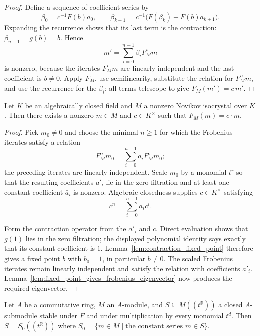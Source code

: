 \begin{proof}
  \leanok
  Define a sequence of coefficient series by
  \[
    \beta_0=c^{-1}F(b)a_0,
    \qquad
    \beta_{k+1}=c^{-1}\bigl(F(\beta_k)+F(b)a_{k+1}\bigr).
  \]
  Expanding the recurrence shows that its last term is the contraction:
  $\beta_{n-1}=g(b)=b$.  Hence
  \[
    m'=\sum_{i=0}^{n-1}\beta_iF_M^im
  \]
  is nonzero, because the iterates $F_M^im$ are linearly independent and the
  last coefficient is $b\ne0$.  Apply $F_M$, use semilinearity, substitute the
  relation for $F_M^nm$, and use the recurrence for the $\beta_i$; all terms
  telescope to give $F_M(m')=c\,m'$.
\end{proof}

\begin{theorem}
  \label{thm:frobenius_eigenvector}
  \leanok
  Let $K$ be an algebraically closed field and $M$ a nonzero Novikov
  isocrystal over $K$. Then there exists a nonzero $m \in M$ and
  $c \in K^\times$ such that $F_M(m) = c \cdot m$.
\end{theorem}

\begin{proof}
  \leanok
  Pick $m_0\ne0$ and choose the minimal $n\geq1$ for which the Frobenius
  iterates satisfy a relation
  \[
    F_M^nm_0=\sum_{i=0}^{n-1}a_iF_M^im_0;
  \]
  the preceding iterates are linearly independent.  Scale $m_0$ by a monomial
  $t^r$ so that the resulting coefficients $a'_i$ lie in the zero filtration
  and at least one constant coefficient $\bar a_i$ is nonzero.  Algebraic
  closedness supplies $c\in K^\times$ satisfying
  \[
    c^n=\sum_{i=0}^{n-1}\bar a_i c^i.
  \]

  Form the contraction operator from the $a'_i$ and $c$.  Direct evaluation
  shows that $g(1)$ lies in the zero filtration; the displayed polynomial
  identity says exactly that its constant coefficient is $1$.
  Lemma~\ref{lem:contraction_fixed_point} therefore gives a fixed point $b$
  with $b_0=1$, in particular $b\ne0$.  The scaled Frobenius iterates remain
  linearly independent and satisfy the relation with coefficients $a'_i$.
  Lemma~\ref{lem:fixed_point_gives_frobenius_eigenvector} now produces the
  required eigenvector.
\end{proof}


\begin{lemma}
  \label{lem:frobenius_limit}
  \leanok
  Let $A$ be a commutative ring, $M$ an $A$-module, and $S \subseteq
  M((t^{\mathbb{R}}))$ a closed $A$-submodule stable under $F$ and under
  multiplication by every monomial $t^d$.  Then $S = S_0((t^{\mathbb{R}}))$
  where $S_0 = \{ m \in M \mid \text{the constant series } m \in S \}$.
\end{lemma}


